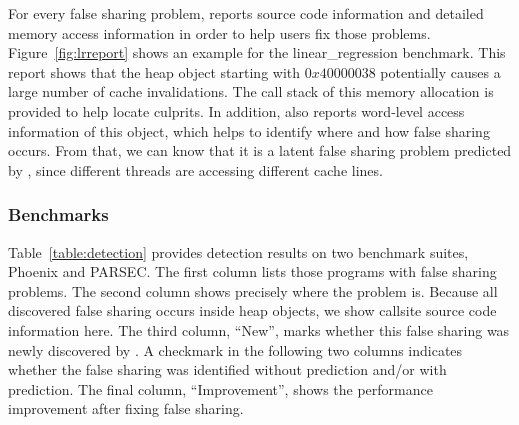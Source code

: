 For every false sharing problem, \Predator{} reports source code information and detailed memory access information in order to help users fix those problems. Figure~\ref{fig:lrreport} shows an example for the linear\_regression benchmark. This report shows that the heap object starting with $0x40000038$ potentially causes a large number of cache invalidations. The call stack of this memory allocation is provided to help locate culprits. In addition, \Predator{} also reports word-level access information of this object, which helps to identify where and how false sharing occurs. From that, we can know that it is a latent false sharing problem predicted by \Predator{}, since different threads are accessing different cache lines. 

\subsubsection{Benchmarks}
\label{sec:benchmarks}

\begin{table}[!t]
{\centering
{}
\caption{False sharing problems in the Phoenix and PARSEC benchmark suites. \label{table:detection}}
}
\end{table}

Table~\ref{table:detection} provides detection results on two benchmark suites, Phoenix and PARSEC. 
The first column lists those programs with false sharing problems.  The second column shows precisely where the problem is. Because all discovered false sharing occurs inside heap objects, we show callsite source code information here.  The third column, ``New'', marks whether this false sharing was newly discovered by \Predator{}.  A checkmark in the following two columns indicates whether the false sharing was identified without
prediction and/or with prediction.  The final column, ``Improvement'', shows the performance improvement after fixing false sharing.

